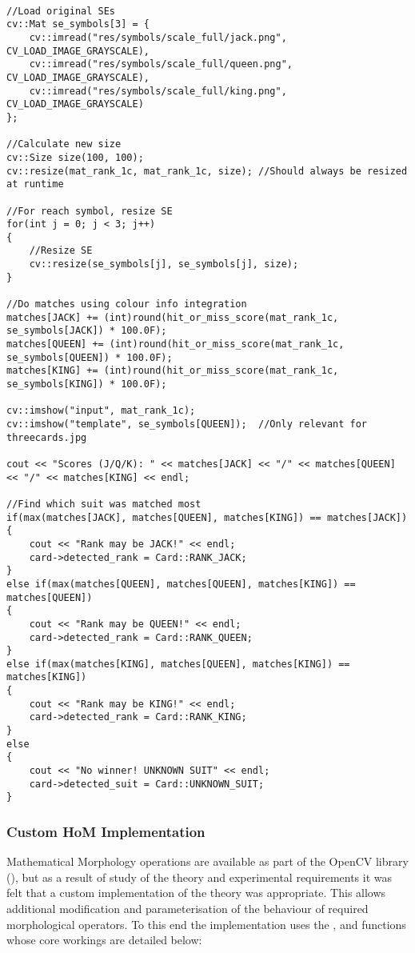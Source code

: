 			\begin{lstlisting}

//Load original SEs
cv::Mat se_symbols[3] = {
	cv::imread("res/symbols/scale_full/jack.png", CV_LOAD_IMAGE_GRAYSCALE),
	cv::imread("res/symbols/scale_full/queen.png", CV_LOAD_IMAGE_GRAYSCALE),
	cv::imread("res/symbols/scale_full/king.png", CV_LOAD_IMAGE_GRAYSCALE)
};

//Calculate new size
cv::Size size(100, 100);
cv::resize(mat_rank_1c, mat_rank_1c, size); //Should always be resized at runtime

//For reach symbol, resize SE
for(int j = 0; j < 3; j++)
{
	//Resize SE
	cv::resize(se_symbols[j], se_symbols[j], size); 
}

//Do matches using colour info integration
matches[JACK] += (int)round(hit_or_miss_score(mat_rank_1c, se_symbols[JACK]) * 100.0F);
matches[QUEEN] += (int)round(hit_or_miss_score(mat_rank_1c, se_symbols[QUEEN]) * 100.0F);
matches[KING] += (int)round(hit_or_miss_score(mat_rank_1c, se_symbols[KING]) * 100.0F);

cv::imshow("input", mat_rank_1c);
cv::imshow("template", se_symbols[QUEEN]);  //Only relevant for threecards.jpg

cout << "Scores (J/Q/K): " << matches[JACK] << "/" << matches[QUEEN] << "/" << matches[KING] << endl;

//Find which suit was matched most
if(max(matches[JACK], matches[QUEEN], matches[KING]) == matches[JACK])
{
	cout << "Rank may be JACK!" << endl;
	card->detected_rank = Card::RANK_JACK;
}
else if(max(matches[QUEEN], matches[QUEEN], matches[KING]) == matches[QUEEN])
{
	cout << "Rank may be QUEEN!" << endl;
	card->detected_rank = Card::RANK_QUEEN;
}
else if(max(matches[KING], matches[QUEEN], matches[KING]) == matches[KING])
{
	cout << "Rank may be KING!" << endl;
	card->detected_rank = Card::RANK_KING;
}
else
{
	cout << "No winner! UNKNOWN SUIT" << endl;
	card->detected_suit = Card::UNKNOWN_SUIT;
}
			\end{lstlisting}

		\subsubsection{Custom HoM Implementation}
			Mathematical Morphology operations are available as part of the OpenCV library\\(), but as a result of study of the theory and experimental requirements it was felt that a custom implementation of the theory was appropriate. This allows additional modification and parameterisation of the behaviour of required morphological operators. To this end the implementation uses the ,  and  functions whose core workings are detailed below:

